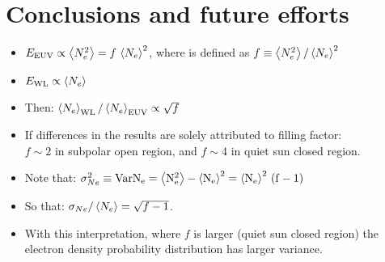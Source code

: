 \documentclass[baaa]{baaa}
\begin{document}
\section{Conclusions and future efforts}
\begin{itemize}
 \item  $\Eeuv \propto \AvgNE2 = f\,\AvgNe^2$, where  is defined as $f\equiv\AvgNE2 / \AvgNe^2$
\salto
\item  $E_{\rm{WL}} \propto \left<N_e\right>$
\salto
\item  Then: $\left<N_e\right>_{\rm{WL}} / \left<N_e\right>_{\rm{EUV}} \propto \sqrt{f}$
\salto
\item  If differences in the results are solely attributed to filling factor:\\
  $f\sim 2$ in subpolar open region, and $f\sim 4$ in quiet sun closed region.
\salto
\item  Note that: $\SigmaNe^2 \equiv \rm{Var}N_e = \AvgNE2 - \AvgNe^2 = \AvgNe^2 \, (f-1)$
\salto
\item  So that: $\sigma_{Ne} / \left<N_e\right> = \sqrt{f-1}$.
\salto
\item  With this interpretation, where $f$ is larger (quiet sun closed region) the electron density probability distribution has larger variance.
\end{itemize}


\small

 
\end{document}
